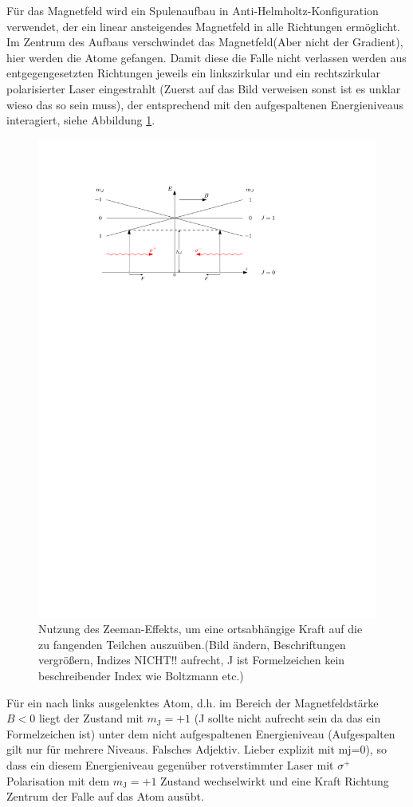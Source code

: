 \documentclass[11pt, a4paper]{article}
\numberwithin{equation}{section}
\newcommand{\korr}[1]{{\color{red}(#1)}}
\begin{document}
Für das Magnetfeld wird ein Spulenaufbau in Anti-Helmholtz-Konfiguration verwendet, der ein linear ansteigendes Magnetfeld in alle Richtungen ermöglicht.
Im Zentrum des Aufbaus verschwindet das Magnetfeld\korr{Aber nicht der Gradient}, hier werden die Atome gefangen.
Damit diese die Falle nicht verlassen werden aus entgegengesetzten Richtungen jeweils ein linkszirkular und ein rechtszirkular polarisierter Laser eingestrahlt \korr{Zuerst auf das Bild verweisen sonst ist es unklar wieso das so sein muss}, der entsprechend mit den aufgespaltenen Energieniveaus interagiert, siehe Abbildung \ref{fig:magnetfeld}.
\begin{figure}[h]
	\centering
	\includegraphics[width=.8\textwidth]{./figures/theory/mot.pdf}
	\caption{Nutzung des Zeeman-Effekts, um eine ortsabhängige Kraft auf die zu fangenden Teilchen auszuüben.\korr{Bild ändern, Beschriftungen vergrößern, Indizes NICHT!! aufrecht, J ist Formelzeichen kein beschreibender Index wie Boltzmann etc.}}
	\label{fig:magnetfeld}
\end{figure}
Für ein nach links ausgelenktes Atom, d.h. im Bereich der Magnetfeldstärke $B<0$ liegt der Zustand mit $m_\mathrm{J}=+1$ \korr{J sollte nicht aufrecht sein da das ein Formelzeichen ist} unter dem nicht aufgespaltenen Energieniveau \korr{Aufgespalten gilt nur für mehrere Niveaus. Falsches Adjektiv. Lieber explizit mit mj=0}, so dass ein diesem Energieniveau gegenüber rotverstimmter Laser mit $\sigma^+$ Polarisation mit dem $m_\mathrm{J}=+1$ Zustand wechselwirkt und eine Kraft Richtung Zentrum der Falle auf das Atom ausübt.
\end{document}
